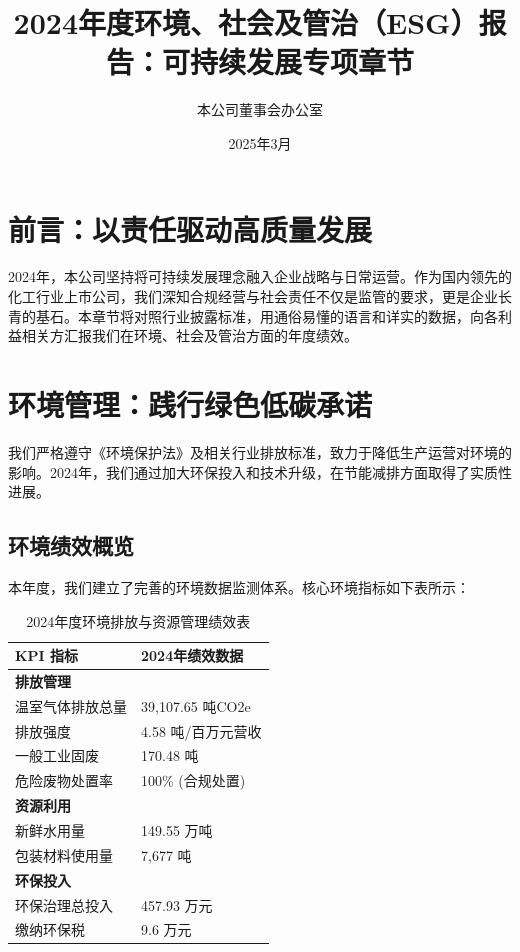 \documentclass[a4paper,12pt]{article}
\title{\textbf{2024年度环境、社会及管治（ESG）报告：可持续发展专项章节}}
\author{本公司董事会办公室}
\date{2025年3月}
\begin{document}
\maketitle

\section*{前言：以责任驱动高质量发展}

2024年，本公司坚持将可持续发展理念融入企业战略与日常运营。作为国内领先的化工行业上市公司，我们深知合规经营与社会责任不仅是监管的要求，更是企业长青的基石。本章节将对照行业披露标准，用通俗易懂的语言和详实的数据，向各利益相关方汇报我们在环境、社会及管治方面的年度绩效。

\section{环境管理：践行绿色低碳承诺}

我们严格遵守《环境保护法》及相关行业排放标准，致力于降低生产运营对环境的影响。2024年，我们通过加大环保投入和技术升级，在节能减排方面取得了实质性进展。

\subsection{环境绩效概览}

本年度，我们建立了完善的环境数据监测体系。核心环境指标如下表所示：

\begin{table}[H]
\centering
\caption{2024年度环境排放与资源管理绩效表}
\begin{tabular}{@{}ll@{}}
\toprule
\textbf{KPI 指标} & \textbf{2024年绩效数据} \\ \midrule
\textbf{排放管理} & \\
温室气体排放总量 & 39,107.65 吨CO2e \\
排放强度 & 4.58 吨/百万元营收 \\
一般工业固废 & 170.48 吨 \\
危险废物处置率 & 100\% (合规处置) \\
\midrule
\textbf{资源利用} & \\
新鲜水用量 & 149.55 万吨 \\
包装材料使用量 & 7,677 吨 \\
\midrule
\textbf{环保投入} & \\
环保治理总投入 & 457.93 万元 \\
缴纳环保税 & 9.6 万元 \\ \bottomrule
\end{tabular}
\end{table}
\end{document}
